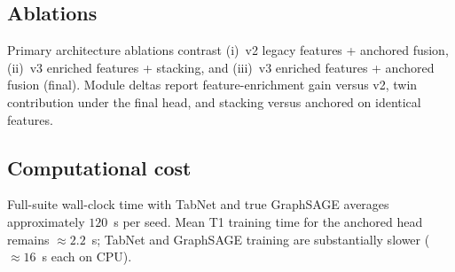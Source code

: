 \subsection{Ablations}
Primary architecture ablations contrast (i)~v2 legacy features + anchored fusion, (ii)~v3 enriched features + stacking, and (iii)~v3 enriched features + anchored fusion (final). Module deltas report feature-enrichment gain versus v2, twin contribution under the final head, and stacking versus anchored on identical features.

\subsection{Computational cost}
Full-suite wall-clock time with TabNet and true GraphSAGE averages approximately $120$~s per seed. Mean T1 training time for the anchored head remains $\approx 2.2$~s; TabNet and GraphSAGE training are substantially slower ($\approx 16$~s each on CPU).
